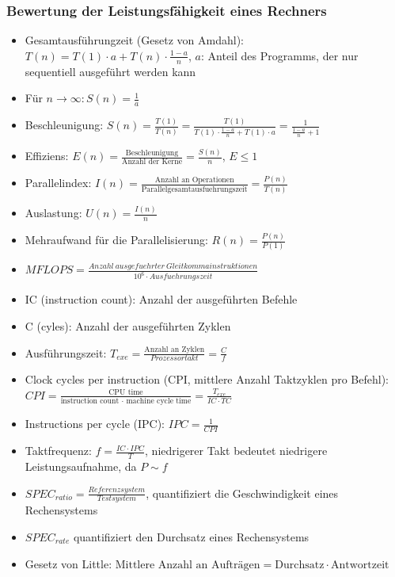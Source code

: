 \subsubsection{Bewertung der Leistungsfähigkeit eines Rechners}
\begin{itemize}
	\item Gesamtausführungzeit (Gesetz von Amdahl): \(T(n) = T(1) \cdot a + T(n) \cdot \frac{1-a}{n}\), \(a\): Anteil des Programms, der nur sequentiell ausgeführt werden kann
	\item Für \(n \rightarrow \infty:S(n)=\frac{1}{a}\)
	\item Beschleunigung: \(S(n) = \frac{T(1)}{T(n)} = \frac{T(1)}{T(1) \cdot \frac{1-a}{n}+T(1) \cdot a} = \frac{1}{\frac{1-a}{n}+1}\)
	\item Effiziens: \(E(n) = \frac{\text{Beschleunigung}}{\text{Anzahl der Kerne}} = \frac{S(n)}{n}\), \(E \le 1\)
	\item Parallelindex: \(I(n) = \frac{\text{Anzahl an Operationen}}{\text{Parallelgesamtausfuehrungszeit}} = \frac{P(n)}{T(n)}\)
	\item Auslastung: \(U(n) = \frac{I(n)}{n}\)
	\item Mehraufwand für die Parallelisierung: \(R(n) = \frac{P(n)}{P(1)}\)
	\item \(MFLOPS = \frac{Anzahl~ausgefuehrter~Gleitkommainstruktionen}{10^6 \cdot Ausfuehrungszeit}\)
	\item IC (instruction count): Anzahl der ausgeführten Befehle
	\item C (cyles): Anzahl der ausgeführten Zyklen
	\item Ausführungszeit: \(T_{exe} = \frac{\text{Anzahl an Zyklen}}{Prozessortakt} = \frac{C}{f}\)
	\item Clock cycles per instruction (CPI, mittlere Anzahl Taktzyklen pro Befehl): \(CPI = \frac{\text{CPU time}}{\text{instruction count } \cdot \text{ machine cycle time}} = \frac{T_{exe}}{IC \cdot TC}\)
	\item Instructions per cycle (IPC): \(IPC = \frac{1}{CPI}\)
	\item Taktfrequenz: \(f = \frac{IC \cdot IPC}{T}\), niedrigerer Takt bedeutet niedrigere Leistungsaufnahme, da \(P \sim f\)
	\item \(SPEC_{ratio} = \frac{Referenzsystem}{Testsystem}\), quantifiziert die Geschwindigkeit eines Rechensystems
	\item \(SPEC_{rate}\) quantifiziert den Durchsatz eines Rechensystems
	\item Gesetz von Little: \(\text{Mittlere Anzahl an Aufträgen} = \text{Durchsatz} \cdot \text{Antwortzeit}\)
\end{itemize}

